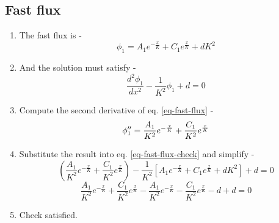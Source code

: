 \documentclass[11pt,a4paper]{article}
\begin{document}
\subsection{Fast flux}
\begin{enumerate}[leftmargin=*,topsep=0pt]
    \item The fast flux is -
        \begin{equation} \label{eq-fast-flux}
            \phi_1=A_1e^{-\frac{x}{K}}+C_1e^{\frac{x}{K}}+dK^2
        \end{equation}
    \item And the solution must satisfy - 
        \begin{equation} \label{eq-fast-flux-check}
            \frac{d^2\phi_1}{dx^2}-\frac{1}{K^2}\phi_1+d=0 
        \end{equation}
    \item Compute the second derivative of eq. \ref{eq-fast-flux} - 
        \begin{equation}
                \phi''_1=\frac{A_1}{K^2}e^{-\frac{x}{K}}+\frac{C_1}{K^2}e^{\frac{x}{K}} \\
        \end{equation}
    \item Substitute the result into eq. \ref{eq-fast-flux-check} and simplify - 
        \begin{equation*}
                (\frac{A_1}{K^2}e^{-\frac{x}{K}}+\frac{C_1}{K^2}e^{\frac{x}{K}})-\frac{1}{K^2}[A_1e^{-\frac{x}{K}}+C_1e^{\frac{x}{K}}+dK^2]+d=0
        \end{equation*}
        \begin{equation*}
                \frac{A_1}{K^2}e^{-\frac{x}{K}}+\frac{C_1}{K^2}e^{\frac{x}{K}}-\frac{A_1}{K^2}e^{-\frac{x}{K}}-\frac{C_1}{K^2}e^{\frac{x}{K}}-d+d=0
        \end{equation*}
    \item[] Check satisfied.
\end{enumerate}
\end{document}

